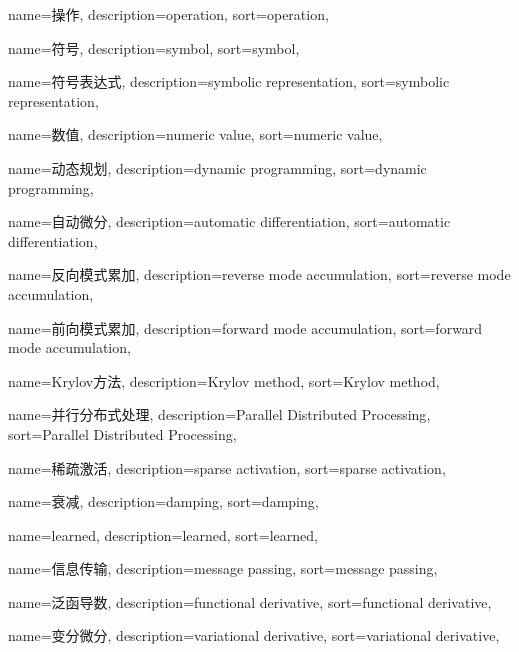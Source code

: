 {
  name=操作,
  description={operation},
  sort={operation},
}

{
  name=符号,
  description={symbol},
  sort={symbol},
}

{
  name=符号表达式,
  description={symbolic representation},
  sort={symbolic representation},
}

{
  name=数值,
  description={numeric value},
  sort={numeric value},
}

{
  name=动态规划,
  description={dynamic programming},
  sort={dynamic programming},
}

{
  name=自动微分,
  description={automatic differentiation},
  sort={automatic differentiation},
}

{
  name=反向模式累加,
  description={reverse mode accumulation},
  sort={reverse mode accumulation},
}

{
  name=前向模式累加,
  description={forward mode accumulation},
  sort={forward mode accumulation},
}

{
  name=Krylov方法,
  description={Krylov method},
  sort={Krylov method},
}

{
  name=并行分布式处理,
  description={Parallel Distributed Processing},
  sort={Parallel Distributed Processing},
}

{
  name=稀疏激活,
  description={sparse activation},
  sort={sparse activation},
}

{
  name=衰减,
  description={damping},
  sort={damping},
}

{
  name=learned,
  description={learned},
  sort={learned},
}

{
  name=信息传输,
  description={message passing},
  sort={message passing},
}

{
  name=泛函导数,
  description={functional derivative},
  sort={functional derivative},
}

{
  name=变分微分,
  description={variational derivative},
  sort={variational derivative},
}

